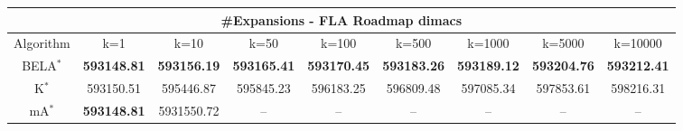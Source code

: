 \begin{tabular}{c|cccccccc}\toprule
\multicolumn{9}{c}{#Expansions - FLA Roadmap dimacs}\\ \midrule
Algorithm & k=1 & k=10 & k=50 & k=100 & k=500 & k=1000 & k=5000 & k=10000 \\ \midrule
BELA$^*$ & \textbf{593148.81} & \textbf{593156.19} & \textbf{593165.41} & \textbf{593170.45} & \textbf{593183.26} & \textbf{593189.12} & \textbf{593204.76} & \textbf{593212.41} \\
K$^*$ & 593150.51 & 595446.87 & 595845.23 & 596183.25 & 596809.48 & 597085.34 & 597853.61 & 598216.31 \\
mA$^*$ & \textbf{593148.81} & 5931550.72 & -- & -- & -- & -- & -- & -- \\ \bottomrule 
\end{tabular}
